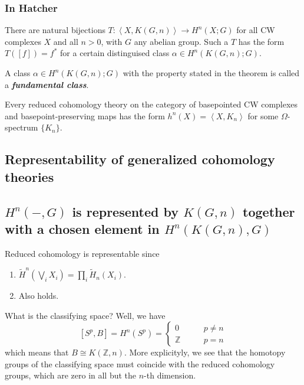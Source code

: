 \begin{remark}
\begin{defn}
\subsubsection{In Hatcher}

\begin{thm}[4.57]
	There are natural bijections $T:\left<X,K(G,n) \right> \to H^{n}(X;G)$ for all CW complexes $X$ and all $n>0$, with $G$ any abelian group. Such a $T$ has the form $T([f])=f^{*}$ for a certain distinguised class $\alpha\in H^{n}(K(G,n);G)$.
\end{thm}

\begin{defn}
	A class $\alpha\in H^{n}(K(G,n);G)$ with the property stated in the theorem is called a \textit{\textbf{fundamental class}}.
\end{defn}


\begin{thm}[4E.1]
	Every reduced cohomology theory on the category of basepointed CW complexes and basepoint-preserving maps has the form $h^{n} (X)=\left<X,K_{n} \right> $ for some $\Omega$-spectrum $\{K_{n}\} $.
\end{thm}


\subsection{Representability of generalized cohomology theories}

\subsection{$H^{n}(-,G)$ is represented by  $K(G,n)$ together with a chosen element in $H^{n}(K(G,n),G)$}

Reduced cohomology is representable since

\begin{enumerate}[label=(\roman*)]
	\item $\widetilde{H}^{n}(\bigvee_{i}X_{i})=\prod_{i} \widetilde{H}_{n}(X_{i})$.
	\item Also holds. 
\end{enumerate}

What is the classifying space? Well, we have
\[[S^{p},B]=H^{n}(S^{p})=\begin{cases}
	0\qquad &p\neq n\\
	\mathbb{Z}\qquad &p=n
\end{cases}\]
which means that $B\cong K(\mathbb{Z},n)$. More explicityly, we see that the homotopy groups of the classifying space must coincide with the reduced cohomology groups, which are zero in all but the $n$-th dimension.


\end{defn}
\end{remark}
